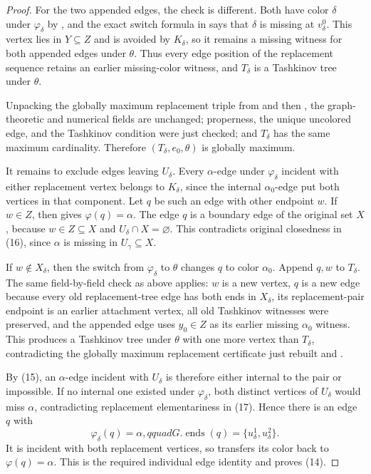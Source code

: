 \begin{proof}
For the two appended edges, the check is different.  Both have color
$\delta$ under $\varphi_\delta$ by
, and the exact switch formula in
 says that $\delta$ is missing at
$v^0_\delta$.  This vertex lies in $Y\subseteq Z$ and is avoided by
$K_\delta$, so it remains a missing witness for both appended edges under
$\theta$.  Thus every edge position of the replacement sequence retains
an earlier missing-color witness, and $T_\delta$ is a Tashkinov tree under
$\theta$.

Unpacking the globally maximum replacement triple from
 and then
, the graph-theoretic and numerical fields are
unchanged; properness, the unique uncolored edge, and the Tashkinov
condition were just checked; and $T_\delta$ has the same maximum cardinality.
Therefore $(T_\delta,e_0,\theta)$ is globally maximum.

It remains to exclude edges leaving $U_\delta$.  Every
$\alpha$-edge under $\varphi_\delta$ incident with either replacement
vertex belongs to $K_\delta$, since the internal $\alpha_0$-edge put both
vertices in that component.  Let $q$ be such an edge with other endpoint
$w$.  If $w\in Z$, then
 gives $\varphi(q)=\alpha$.
The edge $q$ is a boundary edge of the original set $X$, because
$w\in Z\subseteq X$ and $U_\delta\cap X=\varnothing$.  This contradicts
original closedness in (16), since $\alpha$ is missing in
$U_\gamma\subseteq X$.

If $w\notin X_\delta$, then the switch from $\varphi_\delta$ to $\theta$
changes $q$ to color $\alpha_0$.  Append $q,w$ to $T_\delta$.  The same
field-by-field check as above applies: $w$ is a new vertex, $q$ is a new
edge because every old replacement-tree edge has both ends in
$X_\delta$, its replacement-pair endpoint is an earlier attachment
vertex, all old Tashkinov witnesses were preserved, and the appended edge
uses $y_0\in Z$ as its earlier missing $\alpha_0$ witness.  This produces
a Tashkinov tree under $\theta$ with one more vertex than $T_\delta$,
contradicting the globally maximum replacement certificate just rebuilt
and .

By (15), an $\alpha$-edge incident with $U_\delta$ is therefore either
internal to the pair or impossible.  If no internal one existed under
$\varphi_\delta$, both distinct vertices of $U_\delta$ would miss
$\alpha$, contradicting replacement elementariness in (17).  Hence there
is an edge $q$ with
\[
 \varphi_\delta(q)=\alpha,qquad
 G.\operatorname{ends}(q)=\{u^1_\delta,u^2_\delta\}.
\]
It is incident with both replacement vertices, so
 transfers its color back to
$\varphi(q)=\alpha$.  This is the required individual edge identity and
proves (14).
\end{proof}
